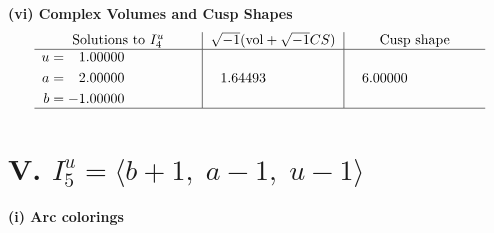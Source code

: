 \documentclass[1p]{elsarticle_modified}
\theoremstyle{definition}
\newcommand{\I}{\sqrt{-1}}
\begin{document}
\newpage\flushleft \textbf{(vi) Complex Volumes and Cusp Shapes}
$$\begin{array}{c|c|c}  
\text{Solutions to }I^u_{4}& \I (\text{vol} + \sqrt{-1}CS) & \text{Cusp shape}\\
 \hline 
\begin{aligned}
u &= \phantom{-}1.00000\phantom{ +0.000000I} \\
a &= \phantom{-}2.00000\phantom{ +0.000000I} \\
b &= -1.00000\phantom{ +0.000000I}\end{aligned}
 & \phantom{-}1.64493\phantom{ +0.000000I} & \phantom{-}6.00000\phantom{ +0.000000I}\\
 \hline 
 \end{array}$$\newpage\newpage\renewcommand{\arraystretch}{1}
\centering \section*{V. $I^u_{5}= \langle b+1,\;a-1,\;u-1 \rangle$}
\flushleft \textbf{(i) Arc colorings}\\
\end{document}
